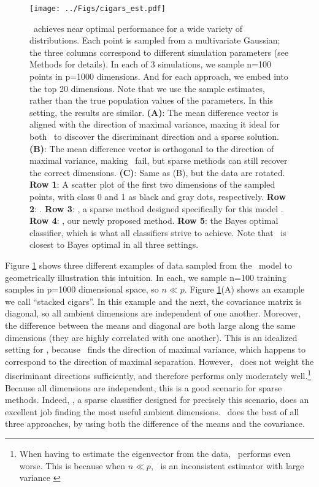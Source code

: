 \documentclass[10pt]{article}
\begin{document}
\begin{figure}%
\centering
\texttt{[image: ../Figs/cigars\_est.pdf]}%
\caption{
\Lol~achieves near optimal performance for a wide variety of distributions. 
Each point is sampled from a multivariate Gaussian; 
the three columns correspond to different simulation parameters (see Methods for details).  
In each of 3 simulations, we sample n=100 points in p=1000 dimensions.  And for each approach, we embed into the top 20 dimensions. Note that we use the sample estimates, rather than the true population values of the parameters.  In this setting, the results are  similar.
\textbf{(A)}: The mean difference vector is aligned with the direction of maximal variance, maxing it ideal for both \Pca~to discover the discriminant direction and a sparse solution.  
\textbf{(B)}: The mean difference vector is orthogonal to the direction of maximal variance, making \Pca~fail, but sparse methods can still recover the correct dimensions.
\textbf{(C)}: Same as (B), but the data are rotated.  
\textbf{Row 1}: A scatter plot of the first two dimensions of the sampled points, with class 0 and 1 as black and gray dots, respectively.  
\textbf{Row 2}: .
\textbf{Row 3}: , a sparse method designed specifically for this model \cite{Fan2012a}.
\textbf{Row 4}: \Lol, our newly proposed method.
\textbf{Row 5}: the Bayes optimal classifier, which is what all classifiers strive to achieve.
Note that \Lol~is closest to Bayes optimal in all three settings.
}
\label{fig:cigars}
\end{figure}


Figure \ref{fig:cigars} shows three different examples of data sampled from the \Lda~model to geometrically illustration this intuition.
In each, we sample n=100 training samples in p=1000 dimensional space, so $n \ll p$.  
Figure \ref{fig:cigars}(A) shows an example we call  ``stacked cigars''. 
In this example and the next, the covariance matrix is diagonal, so all ambient dimensions are independent of one another.  
Moreover,  the difference between the means and diagonal are both large along the same dimensions (they are highly correlated with one another). 
This is an idealized setting for \Pca, because \Pca~finds the direction of maximal variance, which happens to correspond to the direction of maximal separation.  
However, \Pca~does not weight the discriminant directions sufficiently, and therefore performs only moderately well.\footnote{When having to estimate the eigenvector from the data, \Pca~performs even worse.  This is because when $n \ll p$, \Pca~is an inconsistent estimator with large variance \cite{Baik2006a,Paul2007a}}
Because all dimensions are independent, this is a good scenario for sparse methods.  
Indeed,  , a sparse classifier designed for precisely this scenario,  does an excellent job finding the most useful ambient dimensions.  
\Lol~does the best of all three approaches, by using both the difference of the means and the covariance.
\end{document}
